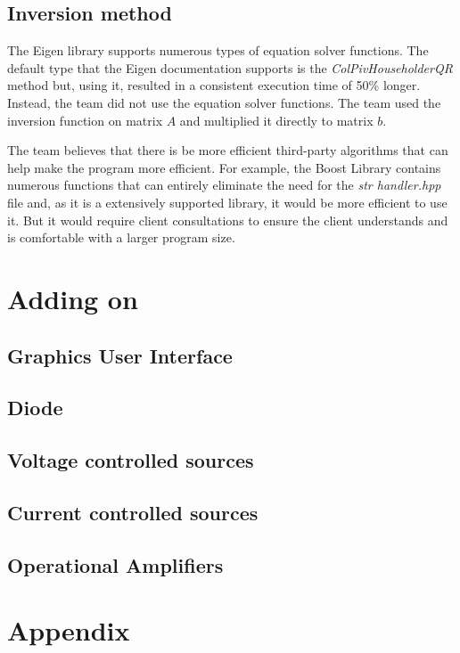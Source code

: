 \documentclass[12pt,a4paper]{article}
\begin{document}
\subsection{Inversion method}
The Eigen library supports numerous types of equation solver functions. The default type that the Eigen documentation supports is the 
\textit{ColPivHouseholderQR} method but, using it, resulted in a consistent execution time of 50\% longer. Instead, the team 
did not use the equation solver functions. The team used the inversion function on matrix $A$ and multiplied it directly to matrix $b$.
\par 
The team believes that there is be more efficient third-party algorithms that can help make the program more efficient. For example, 
the Boost Library contains numerous functions that can entirely eliminate the need for the \textit{str handler.hpp} file and,
as it is a extensively supported library, it would be more efficient to use it. But it would require client consultations to ensure
the client understands and is comfortable with a larger program size. 

\pagebreak

\section{Adding on}
\subsection{Graphics User Interface}
\subsection{Diode}
\subsection{Voltage controlled sources}
\subsection{Current controlled sources}
\subsection{Operational Amplifiers}

\pagebreak

\section{Appendix}
\end{document}
